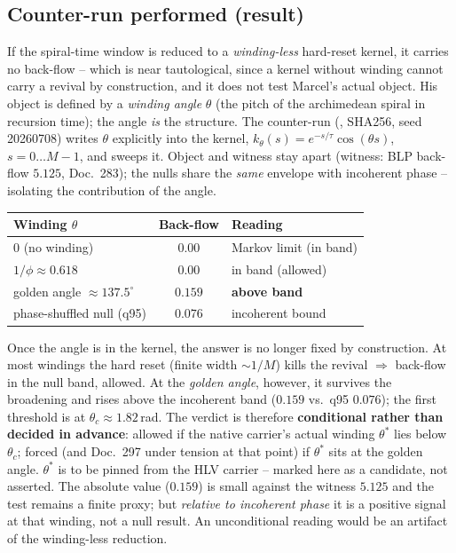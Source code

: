 \subsection*{Counter-run performed (result)}

If the spiral-time window is reduced to a \emph{winding-less} hard-reset
kernel, it carries no back-flow -- which is near tautological, since a kernel
without winding cannot carry a revival by construction, and it does not test
Marcel's actual object. His object is
defined by a \emph{winding angle} $\theta$ (the pitch of the archimedean
spiral in recursion time); the angle \emph{is} the structure. The counter-run
(,
SHA256, seed 20260708) writes $\theta$ explicitly into the kernel,
$k_\theta(s)=e^{-s/\tau}\cos(\theta s)$, $s=0\dots M{-}1$, and sweeps it.
Object and witness stay apart (witness: BLP back-flow $5{.}125$, Doc.~283);
the nulls share the \emph{same} envelope with incoherent phase -- isolating the
contribution of the angle.

\begin{center}\small
\begin{tabular}{lcl}
\hline
Winding $\theta$ & Back-flow & Reading\\
\hline
$0$ (no winding) & $0{.}00$ & Markov limit (in band)\\
$1/\phi \approx 0{.}618$ & $0{.}00$ & in band (allowed)\\
golden angle $\approx 137{.}5^\circ$ & $0{.}159$ & \textbf{above band}\\
phase-shuffled null (q95) & $0{.}076$ & incoherent bound\\
\hline
\end{tabular}
\end{center}

\noindent Once the angle is in the kernel, the answer is no longer fixed by
construction. At most windings the hard reset (finite width $\sim 1/M$) kills
the revival $\Rightarrow$ back-flow in the null band, allowed. At the
\emph{golden angle}, however, it survives the broadening and rises above the
incoherent band ($0{.}159$ vs.\ q95 $0{.}076$); the first threshold is at
$\theta_c\approx 1{.}82$\,rad. The verdict is therefore \textbf{conditional
rather than decided in advance}: allowed if the native carrier's actual winding
$\theta^\ast$ lies below $\theta_c$; forced (and Doc.~297 under tension at that
point) if $\theta^\ast$ sits at the golden angle. $\theta^\ast$ is to be pinned
from the HLV carrier -- marked here as a candidate, not asserted. The absolute
value ($0{.}159$) is small against the witness $5{.}125$ and the test remains a
finite proxy; but \emph{relative to incoherent phase} it is a positive signal
at that winding, not a null result. An unconditional reading would be an
artifact of the winding-less reduction.

